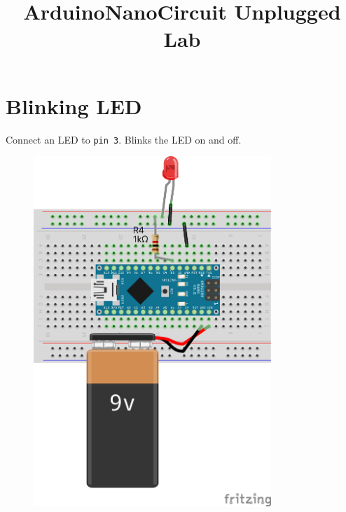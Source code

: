 \documentclass{article}
\begin{document}
\title{ArduinoNanoCircuit Unplugged Lab}
\author{}
\date{}

\newpage
\section*{Blinking LED}
\begin{minipage}{\textwidth}
Connect an LED to \texttt{pin 3}. Blinks the LED on and off.
\end{minipage}
\begin{figure}[h!]
\centering
\includegraphics[width=0.8\textwidth]{led_basic_nano_bb.png}
\end{figure}
\newpage
\end{document}

